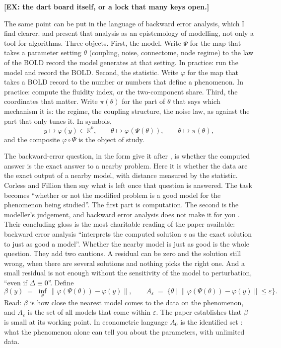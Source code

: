 \documentclass[11pt]{article}
\theoremstyle{definition}\newtheorem{observation}{Observation}
\theoremstyle{remark}\newtheorem{remark}{Remark}
\newcommand{\EX}[1]{\textcolor{orange!80!black}{\textbf{[EX: #1]}}}
\begin{document}
\EX{the dart board itself, or a lock that many keys open.}

The same point can be put in the language of backward error analysis, which I find clearer. \textcite{corless2016} and \textcite{fillion2014} present that analysis as an epistemology of modelling, not only a tool for algorithms. Three objects. First, the model. Write $\Psi$ for the map that takes a parameter setting $\theta$ (coupling, noise, connectome, node regime) to the law of the BOLD record the model generates at that setting. In practice: run the model and record the BOLD. Second, the statistic. Write $\varphi$ for the map that takes a BOLD record to the number or numbers that define a phenomenon. In practice: compute the fluidity index, or the two-component share. Third, the coordinates that matter. Write $\pi(\theta)$ for the part of $\theta$ that says which mechanism it is: the regime, the coupling structure, the noise law, as against the part that only tunes it. In symbols,
\begin{equation}
y \mapsto \varphi(y)\in\mathbb{R}^{k}, \qquad \theta \mapsto \varphi(\Psi(\theta)), \qquad \theta \mapsto \pi(\theta),
\label{eq:objects}
\end{equation}
and the composite $\varphi\circ\Psi$ is the object of study.

The backward-error question, in the form \textcite{corless2016} give it after \textcite{wilkinson1963}, is whether the computed answer is the exact answer to a nearby problem. Here it is whether the data are the exact output of a nearby model, with distance measured by the statistic. Corless and Fillion then say what is left once that question is answered. The task becomes ``whether or not the modified problem is a good model for the phenomenon being studied''. The first part is computation. The second is the modeller's judgement, and backward error analysis does not make it for you \parencite{fillion2014}. Their concluding gloss is the most charitable reading of the paper available: backward error analysis ``interprets the computed solution $z$ as the exact solution to just as good a model''. Whether the nearby model is just as good is the whole question. They add two cautions. A residual can be zero and the solution still wrong, when there are several solutions and nothing picks the right one. And a small residual is not enough without the sensitivity of the model to perturbation, ``even if $\Delta\equiv 0$''. Define
\begin{equation}
\beta(y)\;=\;\inf_{\theta}\,\bigl\|\varphi(\Psi(\theta))-\varphi(y)\bigr\|,
\qquad
A_{\varepsilon}\;=\;\bigl\{\theta \;\big|\; \|\varphi(\Psi(\theta))-\varphi(y)\|\le\varepsilon\bigr\}.
\label{eq:beta}
\end{equation}
Read: $\beta$ is how close the nearest model comes to the data on the phenomenon, and $A_\varepsilon$ is the set of all models that come within $\varepsilon$. The paper establishes that $\beta$ is small at its working point. In econometric language $A_0$ is the identified set \parencite{koopmans1950,manski2003}: what the phenomenon alone can tell you about the parameters, with unlimited data.
\end{document}

